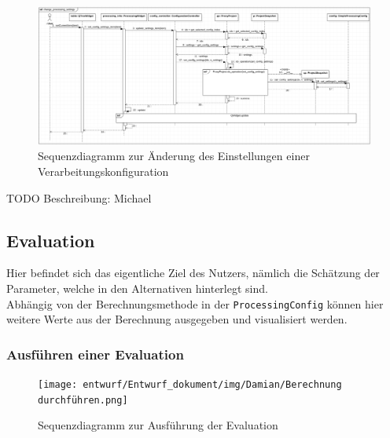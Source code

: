 \documentclass{article}
\begin{document}
\begin{figure}[H]%
    \centering
    \includegraphics[width=13cm]{entwurf/Entwurf_dokument/img/Michael/sd_change_processing_settings.png}
    \caption{Sequenzdiagramm zur Änderung des Einstellungen einer Verarbeitungskonfiguration}
\end{figure}

TODO Beschreibung: Michael


\subsection{Evaluation}
Hier befindet sich das eigentliche Ziel des Nutzers, nämlich die Schätzung der Parameter, welche in den Alternativen hinterlegt sind. \\
Abhängig von der Berechnungsmethode in der \texttt{ProcessingConfig} können hier weitere Werte aus der Berechnung ausgegeben und visualisiert werden.

\subsubsection{Ausführen einer Evaluation}
\begin{figure}[H]%
    \centering
    \texttt{[image: entwurf/Entwurf\_dokument/img/Damian/Berechnung durchführen.png]}
    \caption{Sequenzdiagramm zur Ausführung der Evaluation}
    \label{fig:sq:CalculateEvaluation}
\end{figure}
\end{document}
